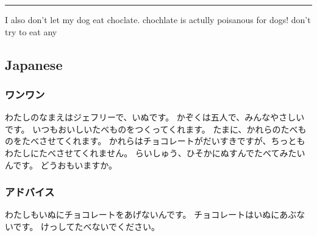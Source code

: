 \documentclass[letterpaper]{article}
\begin{document}
\noindent\rule{\textwidth}{0.5pt}

I also don't let my dog eat choclate. chochlate is actully poisanous for
dogs! don't try to eat any

\subsection{Japanese}
\label{sec:org1a64dff}
\subsubsection{ワンワン}
\label{sec:org8e07618}
わたしのなまえはジェフリーで、いぬです。
かぞくは五人で、みんなやさしいです。
いつもおいしいたべものをつくってくれます。
たまに、かれらのたべものをたべさせてくれます。
かれらはチョコレートがだいすきですが、ちっともわたしにたべさせてくれません。
らいしゅう、ひそかにぬすんでたべてみたいんです。 どうおもいますか。

\subsubsection{アドバイス}
\label{sec:org1c6f41f}
わたしもいぬにチョコレートをあげないんです。
チョコレートはいぬにあぶないです。 けっしてたべないでください。
\end{document}

